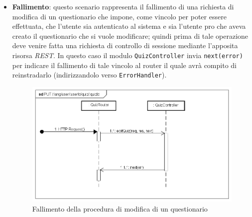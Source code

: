\begin{itemize}
\item \textbf{Fallimento}: questo scenario rappresenta il fallimento di una richiesta di modifica di un questionario che impone, come vincolo per poter essere effettuata, che l'utente sia autenticato al sistema e sia l'utente pro che aveva creato il questionario che si vuole modificare; quindi prima di tale operazione deve venire fatta una richiesta di controllo di sessione mediante l'apposita risorsa \textit{REST}. In questo caso il modulo \texttt{QuizController} invia \texttt{next(error)} per indicare il fallimento di tale vincolo al router il quale avrà compito di reinstradarlo (indirizzandolo verso \texttt{ErrorHandler}).
\label{Fallimento della procedura di modifica di un questionario}
\begin{figure}[ht]
	\centering
	\includegraphics[scale=0.40]{UML/DiagrammiDiSequenza/Back-end/PUT__lang_user_userId_quiz_quizId_failure.png}
	\caption{Fallimento della procedura di modifica di un questionario}
\end{figure}
\FloatBarrier
\end{itemize}

